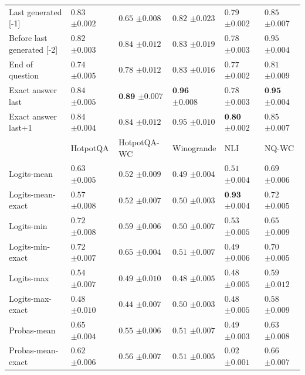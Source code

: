 \begin{table}[t]
{\begin{tabular}{l|lllll}
Last generated [-1] & $0.83$ \tiny$\pm 0.002$ & $0.65$ \tiny$\pm 0.008$ & $0.82$ \tiny$\pm 0.023$ & $0.79$ \tiny$\pm 0.002$ & $0.85$ \tiny$\pm 0.007$ \\
Before last generated [-2] & $0.82$ \tiny$\pm 0.003$ & $0.84$ \tiny$\pm 0.012$ & $0.83$ \tiny$\pm 0.019$ & $0.78$ \tiny$\pm 0.003$ & $0.95$ \tiny$\pm 0.004$ \\
End of question & $0.74$ \tiny$\pm 0.005$ & $0.78$ \tiny$\pm 0.012$ & $0.83$ \tiny$\pm 0.016$ & $0.77$ \tiny$\pm 0.002$ & $0.81$ \tiny$\pm 0.009$ \\
\midrule
Exact answer last & $0.84$ \tiny$\pm 0.005$ & $\textbf{0.89}$ \tiny$\pm 0.007$ & $\textbf{0.96}$ \tiny$\pm 0.008$ & $0.78$ \tiny$\pm 0.003$ & $\textbf{0.95}$ \tiny$\pm 0.004$ \\
Exact answer last+1 & $0.84$ \tiny$\pm 0.004$ & $0.84$ \tiny$\pm 0.012$ & $0.95$ \tiny$\pm 0.010$ & $\textbf{0.80}$ \tiny$\pm 0.002$ & $0.85$ \tiny$\pm 0.007$ \\
     \midrule
    & HotpotQA & HotpotQA-WC & Winogrande & NLI & NQ-WC \\
    \midrule
    Logits-mean & $0.63$ \tiny$\pm 0.005$ & $0.52$ \tiny$\pm 0.009$ & $0.49$ \tiny$\pm 0.004$ & $0.51$ \tiny$\pm 0.004$ & $0.69$ \tiny$\pm 0.006$ \\
Logits-mean-exact & $0.57$ \tiny$\pm 0.008$ & $0.52$ \tiny$\pm 0.007$ & $0.50$ \tiny$\pm 0.003$ & $\textbf{0.93}$ \tiny$\pm 0.004$ & $0.72$ \tiny$\pm 0.005$ \\
Logits-min & $0.72$ \tiny$\pm 0.008$ & $0.59$ \tiny$\pm 0.006$ & $0.50$ \tiny$\pm 0.007$ & $0.53$ \tiny$\pm 0.005$ & $0.65$ \tiny$\pm 0.009$ \\
Logits-min-exact & $0.72$ \tiny$\pm 0.007$ & $0.65$ \tiny$\pm 0.004$ & $0.51$ \tiny$\pm 0.007$ & $0.49$ \tiny$\pm 0.006$ & $0.70$ \tiny$\pm 0.005$ \\
Logits-max & $0.54$ \tiny$\pm 0.007$ & $0.49$ \tiny$\pm 0.010$ & $0.48$ \tiny$\pm 0.005$ & $0.48$ \tiny$\pm 0.005$ & $0.59$ \tiny$\pm 0.012$ \\
Logits-max-exact & $0.48$ \tiny$\pm 0.010$ & $0.44$ \tiny$\pm 0.007$ & $0.50$ \tiny$\pm 0.003$ & $0.48$ \tiny$\pm 0.005$ & $0.58$ \tiny$\pm 0.009$ \\
Probas-mean & $0.65$ \tiny$\pm 0.004$ & $0.55$ \tiny$\pm 0.006$ & $0.51$ \tiny$\pm 0.007$ & $0.49$ \tiny$\pm 0.003$ & $0.63$ \tiny$\pm 0.008$ \\
Probas-mean-exact & $0.62$ \tiny$\pm 0.006$ & $0.56$ \tiny$\pm 0.007$ & $0.51$ \tiny$\pm 0.005$ & $0.02$ \tiny$\pm 0.001$ & $0.66$ \tiny$\pm 0.007$ \\

\end{tabular}}
\end{table}
